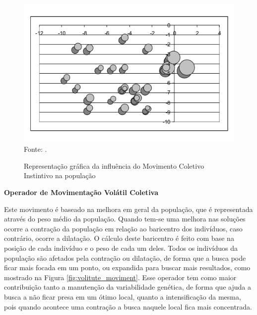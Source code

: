 \begin{figure}[!htb]
	\caption{Representação gráfica da influência do Movimento Coletivo Instintivo na população}
	\centering
	\includegraphics[scale=0.5]{images/movimento_coletivo.png}
	\label{fig:coletive_moviment}{\\Fonte: .}
\end{figure}

\noindent \textbf{Operador de Movimentação Volátil Coletiva}

Este movimento é baseado na melhora em geral da população, que é representada através do peso médio da população. Quando tem-se uma melhora nas soluções ocorre a contração da população em relação ao baricentro dos indivíduos, caso contrário, ocorre a dilatação. O cálculo deste baricentro é feito com base na posição de cada indivíduo e o peso de cada um deles. Todos os indivíduos da população são afetados pela contração ou dilatação, de forma que a busca pode ficar mais focada em um ponto, ou expandida para buscar mais resultados, como mostrado na Figura \ref{fig:volitute_moviment}. Esse operador tem como maior contribuição tanto a manutenção da variabilidade genética, de forma que ajuda a busca a não ficar presa em um ótimo local, quanto a intensificação da mesma, pois quando acontece uma contração a busca naquele local fica mais concentrada.


